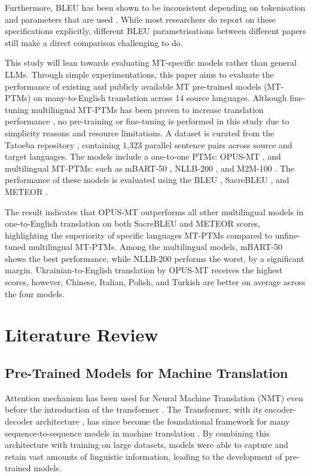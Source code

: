 \documentclass[a4paper, 11pt]{article}
\begin{document}
Furthermore, BLEU \cite{papieni-2002-bleu} has been shown to be inconsistent depending on tokenisation and parameters that are used \cite{post-2018-sacrebleu}. While most researchers do report on these specifications explicitly, different BLEU parametrisations between different papers still make a direct comparison challenging to do.

This study will lean towards evaluating MT-specific models rather than general LLMs. Through simple experimentations, this paper aims to evaluate the performance of existing and publicly available MT pre-trained models (MT-PTMs) on many-to-English translation across 14 source languages. Although fine-tuning multilingual MT-PTMs has been proven to increase translation performance \cite{cooper-stickland-2021-recipes}, no pre-training or fine-tuning is performed in this study due to simplicity reasons and resource limitations. A dataset is curated from the Tatoeba repository \cite{tatoeba}, containing 1,323 parallel sentence pairs across source and target languages. The models include a one-to-one PTMs: OPUS-MT \cite{tiedemann-2023-democratizing,tiedemann-2020-opus-mt}, and multilingual MT-PTMs: such as mBART-50 \cite{liu-2020-mbart}, NLLB-200 \cite{nllb200-2020}, and M2M-100 \cite{fan-2020-m2m100}. The performance of these models is evaluated using the BLEU \cite{papieni-2002-bleu}, SacreBLEU \cite{post-2018-sacrebleu}, and METEOR \cite{lavie-2007-meteor}.

The result indicates that OPUS-MT outperforms all other multilingual models in one-to-English translation on both SacreBLEU and METEOR scores, highlighting the superiority of specific languages MT-PTMs compared to unfine-tuned multilingual MT-PTMs. Among the multilingual models, mBART-50 shows the best performance, while NLLB-200 performs the worst, by a significant margin. Ukrainian-to-English translation by OPUS-MT receives the highest scores, however, Chinese, Italian, Polish, and Turkish are better on average across the four models.

\section{Literature Review}

\subsection{Pre-Trained Models for Machine Translation}

Attention mechanism has been used for Neural Machine Translation (NMT) \cite{bahdanau-2016-nmt-jointly, luong-2015-effective-attention} even before the introduction of the transformer \cite{vaswani-2017-attention}. The Transformer, with its encoder-decoder architecture \cite{vaswani-2017-attention}, has since become the foundational framework for many sequence-to-sequence models in machine translation \cite{cho-2014-properties}. By combining this architecture with training on large datasets, models were able to capture and retain vast amounts of linguistic information, leading to the development of pre-trained models.
\end{document}
